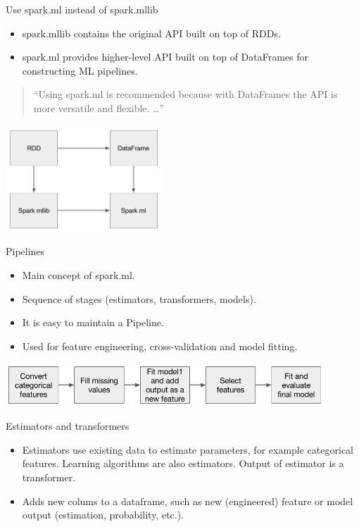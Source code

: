 \documentclass[unicode, notheorems]{beamer}
\begin{document}
\begin{frame}{Use spark.ml instead of spark.mllib}
\begin{itemize}
\item spark.mllib contains the original API built on top of RDDs.
\item spark.ml provides higher-level API built on top of DataFrames for constructing ML pipelines.
\end{itemize}

\begin{quote}
``Using spark.ml is recommended because with DataFrames the API is more versatile and flexible. \dots ''
\end{quote}

\begin{center}
	\includegraphics[height=4cm]{images/mllib-ml}
\end{center}

\end{frame}

\begin{frame}{Pipelines}
\begin{itemize}
\item Main concept of spark.ml.
\item Sequence of stages (estimators, transformers, models).
\item It is easy to maintain a Pipeline.
\item Used for feature engineering, cross-validation and model fitting.
\end{itemize}

\bigskip
\includegraphics[width=12cm]{./images/pipeline}
\end{frame}


\begin{frame}{Estimators and transformers}
\begin{itemize}
\item Estimators use existing data to estimate parameters, for example categorical features. Learning algorithms are also estimators. Output of estimator is a transformer.
\item Adds new colums to a dataframe, such as new (engineered) feature or model output (estimation, probability, etc.). 
\end{itemize}
\end{frame}
\end{document}
